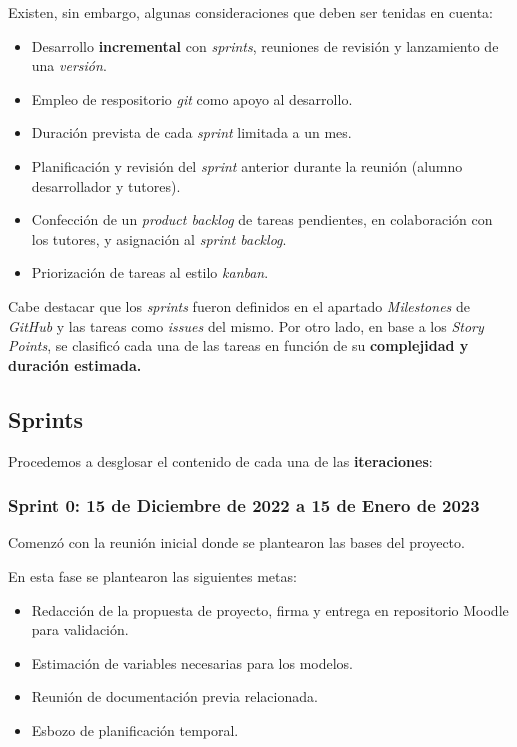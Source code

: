 Existen, sin embargo, algunas consideraciones que deben ser tenidas en cuenta:
\begin{itemize}
    \item Desarrollo \textbf{incremental} con \textit{sprints}, reuniones de revisión y lanzamiento de una \textit{versión}.
    \item Empleo de respositorio \textit{git} como apoyo al desarrollo.
    \item Duración prevista de cada \textit{sprint} limitada a un mes.
    \item Planificación y revisión del \textit{sprint} anterior durante la reunión (alumno desarrollador y tutores).
    \item Confección de un \textit{product backlog} de tareas pendientes, en colaboración con los tutores, y asignación al \textit{sprint backlog}.
    \item Priorización de tareas al estilo \textit{kanban}.
\end{itemize}

Cabe destacar que los \textit{sprints} fueron definidos en el apartado \textit{Milestones} de \textit{GitHub} y las tareas como \textit{issues} del mismo.
Por otro lado, en base a los \textit{Story Points}, se clasificó cada una de las tareas en función de su \textbf{complejidad y duración estimada.}

\subsection{Sprints}

Procedemos a desglosar el contenido de cada una de las \textbf{iteraciones}:

\subsubsection{Sprint 0: 15 de Diciembre de 2022 a 15 de Enero de 2023}

Comenzó con la reunión inicial donde se plantearon las bases del proyecto.

En esta fase se plantearon las siguientes metas:
\begin{itemize}
    \item Redacción de la propuesta de proyecto, firma y entrega en repositorio Moodle para validación.
    \item Estimación de variables necesarias para los modelos.
    \item Reunión de documentación previa relacionada.
    \item Esbozo de planificación temporal.
\end{itemize}

